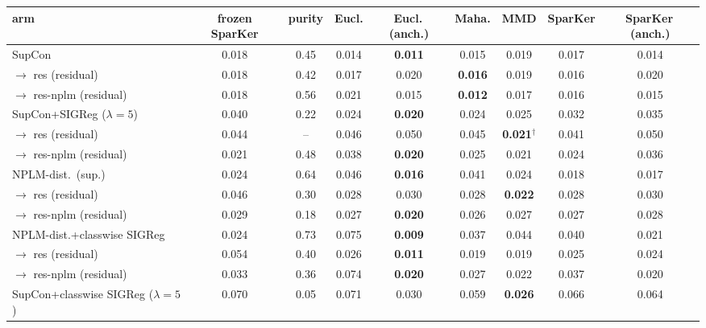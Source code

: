 \begin{table}[t]
\centering
\footnotesize
\begin{tabular}{lcccccccc}
\toprule
arm & frozen SparKer & purity & Eucl. & Eucl.\,(anch.) & Maha. & MMD & SparKer & SparKer\,(anch.) \\
\midrule
SupCon & 0.018 & 0.45 & 0.014 & \textbf{0.011} & 0.015 & 0.019 & 0.017 & 0.014 \\
\quad $\to$ res (residual) & 0.018 & 0.42 & 0.017 & 0.020 & \textbf{0.016} & 0.019 & 0.016 & 0.020 \\
\quad $\to$ res-nplm (residual) & 0.018 & 0.56 & 0.021 & 0.015 & \textbf{0.012} & 0.017 & 0.016 & 0.015 \\
\addlinespace
SupCon+SIGReg ($\lambda{=}5$) & 0.040 & 0.22 & 0.024 & \textbf{0.020} & 0.024 & 0.025 & 0.032 & 0.035 \\
\quad $\to$ res (residual) & 0.044 & -- & 0.046 & 0.050 & 0.045 & \textbf{0.021$^\dagger$} & 0.041 & 0.050 \\
\quad $\to$ res-nplm (residual) & 0.021 & 0.48 & 0.038 & \textbf{0.020} & 0.025 & 0.021 & 0.024 & 0.036 \\
\addlinespace
NPLM-dist.\ (sup.) & 0.024 & 0.64 & 0.046 & \textbf{0.016} & 0.041 & 0.024 & 0.018 & 0.017 \\
\quad $\to$ res (residual) & 0.046 & 0.30 & 0.028 & 0.030 & 0.028 & \textbf{0.022} & 0.028 & 0.030 \\
\quad $\to$ res-nplm (residual) & 0.029 & 0.18 & 0.027 & \textbf{0.020} & 0.026 & 0.027 & 0.027 & 0.028 \\
\addlinespace
NPLM-dist.+classwise SIGReg & 0.024 & 0.73 & 0.075 & \textbf{0.009} & 0.037 & 0.044 & 0.040 & 0.021 \\
\quad $\to$ res (residual) & 0.054 & 0.40 & 0.026 & \textbf{0.011} & 0.019 & 0.019 & 0.025 & 0.024 \\
\quad $\to$ res-nplm (residual) & 0.033 & 0.36 & 0.074 & \textbf{0.020} & 0.027 & 0.022 & 0.037 & 0.020 \\
\addlinespace
SupCon+classwise SIGReg ($\lambda{=}5$) & 0.070 & 0.05 & 0.071 & 0.030 & 0.059 & \textbf{0.026} & 0.066 & 0.064 \\

\end{tabular}
\end{table}
